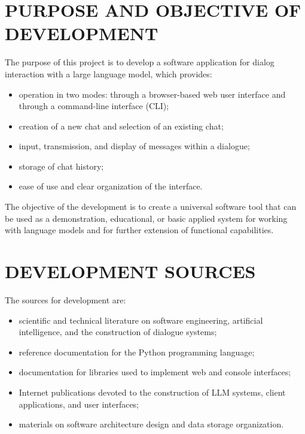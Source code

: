 \documentclass[12pt,a4paper]{article}
\begin{document}
    \section{PURPOSE AND OBJECTIVE OF DEVELOPMENT}

    The purpose of this project is to develop a software application for dialog interaction
    with a large language model, which provides:

    \begin{itemize}
        \item operation in two modes: through a browser-based web user interface and through a command-line interface (CLI);
        \item creation of a new chat and selection of an existing chat;
        \item input, transmission, and display of messages within a dialogue;
        \item storage of chat history;
        \item ease of use and clear organization of the interface.
    \end{itemize}

    The objective of the development is to create a universal software tool
    that can be used as a demonstration, educational, or basic applied system
    for working with language models and for further extension of functional capabilities.

    \section{DEVELOPMENT SOURCES}

    The sources for development are:

    \begin{itemize}
        \item scientific and technical literature on software engineering, artificial intelligence, and the construction of dialogue systems;
        \item reference documentation for the Python programming language;
        \item documentation for libraries used to implement web and console interfaces;
        \item Internet publications devoted to the construction of LLM systems, client applications, and user interfaces;
        \item materials on software architecture design and data storage organization.
    \end{itemize}
\end{document}
